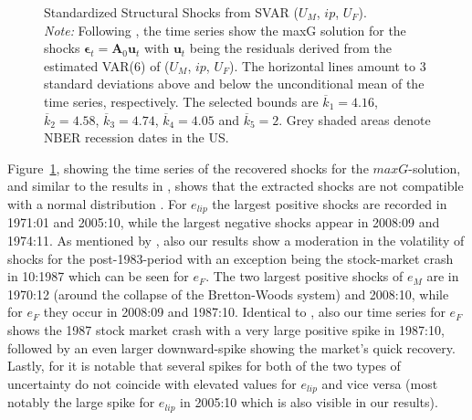 \documentclass[a4paper,11pt,listof=nochaptergap,oneside,pointednumbers,bibtotoc,bigheadings,liststotoc,hidelinks]{scrbook}
\theoremstyle{mysatz}
\theoremstyle{mydefinition}
\theoremstyle{mytheorem}
\theoremstyle{mybemerkung}
\newcommand{\vect}[1]{\boldsymbol{\mathbf{#1}}}
\begin{document}
\begin{figure}[!h]
   \centering
   \setlength\fboxsep{0pt}
   \setlength\fboxrule{0pt}
      \caption[Standardized Structural Shocks from SVAR ($U_{M}$, $ip$, $U_{F}$).]{Standardized Structural Shocks from SVAR ($U_{M}$, $ip$, $U_{F}$).\\
      \textit{Note:}  Following \citet{ludvigsonetal:18}, the time series show the maxG solution for the shocks $\vect{\epsilon}_t = \vect{A}_0\vect{u}_t$ with $\vect{u}_t$ being the residuals derived from the estimated VAR(6) of ($U_{M}$, $ip$, $U_{F}$). The horizontal lines amount to 3 standard deviations above and below the unconditional mean of the time series, respectively. The selected bounds are $\overline{k}_1 = 4.16$, $\overline{k}_2 = 4.58$, $\overline{k}_3 = 4.74$, $\overline{k}_4 = 4.05$ and $\overline{k}_5 = 2$. Grey shaded areas denote NBER recession dates in the US.}   \label{fig:ludvigsonetal_timeseries_e_shocks}
\end{figure}

Figure~\ref{fig:ludvigsonetal_timeseries_e_shocks}, showing the time series of the recovered shocks for the $maxG$-solution, and similar to the results in \citet{ludvigsonetal:19}, shows that the extracted shocks are not compatible with a normal distribution \citep{ludvigsonetal:19}. For $e_{lip}$ the largest positive shocks are recorded in 1971:01 and 2005:10, while the largest negative shocks appear in 2008:09 and 1974:11. As mentioned by \citet{ludvigsonetal:19}, also our results show a moderation in the volatility of shocks for the post-1983-period with an exception being the stock-market crash in 10:1987 which can be seen for $e_{F}$. The two largest positive shocks of $e_{M}$ are in 1970:12 (around the collapse of the Bretton-Woods system) and 2008:10, while for $e_{F}$ they occur in 2008:09 and 1987:10. Identical to \citet{ludvigsonetal:19}, also our time series for $e_{F}$ shows the 1987 stock market crash with a very large positive spike in 1987:10, followed by an even larger downward-spike showing the market's quick recovery. Lastly, for \citet{ludvigsonetal:19} it is notable that several spikes for both of the two types of uncertainty do not coincide with elevated values for $e_{lip}$ and vice versa (most notably the large spike for $e_{lip}$ in 2005:10 which is also visible in our results).
\end{document}
